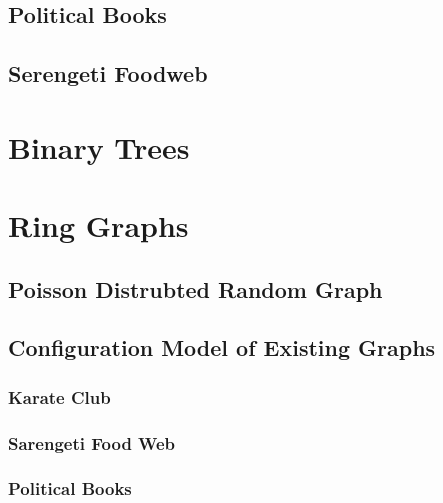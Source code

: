 \documentclass[twocolumn,twoside]{IEEEtran}
\begin{document}
\subsection*{Political Books}

\subsection*{Serengeti Foodweb}

\break
\section*{Binary Trees}


\break
\section*{Ring Graphs}


\subsection*{Poisson Distrubted Random Graph}

\subsection*{Configuration Model of Existing Graphs}

\subsubsection*{Karate Club}

\subsubsection*{Sarengeti Food Web}

\subsubsection*{Political Books}
\end{document}

